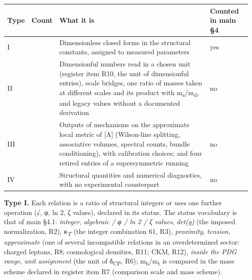 \documentclass[11pt,a4paper]{article}
\begin{document}
\begin{longtable}[]{@{}
  >{\raggedright\arraybackslash}p{}
  >{\raggedright\arraybackslash}p{}
  >{\raggedright\arraybackslash}p{}
  >{\raggedright\arraybackslash}p{}@{}}
\toprule\noalign{}
\begin{minipage}[b]{\linewidth}\raggedright
Type
\end{minipage} & \begin{minipage}[b]{\linewidth}\raggedright
Count
\end{minipage} & \begin{minipage}[b]{\linewidth}\raggedright
What it is
\end{minipage} & \begin{minipage}[b]{\linewidth}\raggedright
Counted in main §4
\end{minipage} \\
\midrule\noalign{}
\endhead
\bottomrule\noalign{}
\endlastfoot
I & 33 & Dimensionless closed forms in the structural constants, assigned to measured parameters & yes \\
II & 19 & Dimensionful numbers read in a chosen unit (register item R10, the unit of dimensionful entries), scale bridges, one ratio of masses taken at different scales and its product with m\textsubscript{s}/m\textsubscript{d}, and legacy values without a documented derivation & no \\
III & 21 & Outputs of mechanisms on the approximate local metric of {[}A{]} (Wilson-line splitting, associative volumes, spectral counts, bundle conditioning), with calibration choices; and four retired entries of a supersymmetric running & no \\
IV & 22 & Structural quantities and numerical diagnostics, with no experimental counterpart & no \\
\end{longtable}

\textbf{Type I.} Each relation is a ratio of structural integers or uses one further operation (√, φ, ln 2, ζ values), declared in its status. The status vocabulary is that of main §4.1: \emph{integer}, \emph{algebraic / φ / ln 2 / ζ values}, \emph{det(g)} (the imposed normalization, R2), \emph{κ\textsubscript{T}} (the integer combination 61, R3), \emph{proximity}, \emph{tension}, \emph{approximate} (one of several incompatible relations in an overdetermined sector: charged leptons, R8; cosmological densities, R11; CKM, R12), \emph{inside the PDG range}, \emph{unit assignment} (the unit of δ\textsubscript{CP}, R6); m\textsubscript{b}/m\textsubscript{t} is compared in the mass scheme declared in register item R7 (comparison scale and mass scheme).
\end{document}

